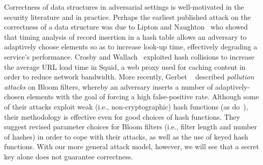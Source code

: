 Correctness of data structures in adversarial settings is well-motivated in the
security literature and in practice.
%
Perhaps the earliest published attack on the correctness of a data structure was due to
Lipton and Naughton~\cite{lipton1993clocked} who showed that timing analysis of
record insertion in a hash table allows an adversary to adaptively choose
elements so as to increase look-up time, effectively degrading a service's
performance.
%
Crosby and Wallach~\cite{crosby2003denial} exploited hash collisions to increase
the average URL load time in Squid, a web proxy used for caching content in
order to reduce network bandwidth.
%
More recently, Gerbet \etal~\cite{gerbet2015power} described \emph{pollution
attacks} on Bloom filters, whereby an adversary inserts a number of
adaptively-chosen elements with the goal of forcing a high false-positive rate.
Although some of their attacks exploit weak (i.e., non-cryptographic) hash
functions (as do~\cite{crosby2003denial}), their methodology is effective even
for good choices of hash functions.
%
They suggest revised parameter choices for Bloom filters (i.e., filter length and
number of hashes) in order to cope with their attacks, as well as the use of
keyed hash functions. With our more general attack model, however, we will see
that a secret key alone does not guarantee correctness.



\fi

